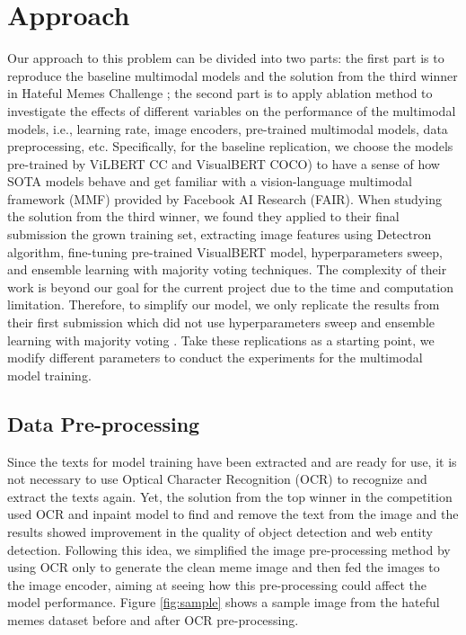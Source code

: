 \documentclass[10pt,twocolumn,letterpaper]{article}
\begin{document}
\section{Approach}
Our approach to this problem can be divided into two parts: the first part is to reproduce the baseline multimodal models \cite{g_kiela2021hateful} and the solution from the third winner in Hateful Memes Challenge \cite{e_velioglu2020detecting}; the second part is to apply ablation method to investigate the effects of different variables on the performance of the multimodal models, i.e., learning rate, image encoders, pre-trained multimodal models, data preprocessing, etc. Specifically, for the baseline replication, we choose the models pre-trained by ViLBERT CC and VisualBERT COCO) to have a sense of how SOTA models behave and get familiar with a vision-language multimodal framework (MMF) provided by Facebook AI Research (FAIR). When studying the solution from the third winner, we found they applied to their final submission the grown training set, extracting image features using Detectron algorithm, fine-tuning pre-trained VisualBERT model, hyperparameters sweep, and ensemble learning with majority voting techniques. The complexity of their work is beyond our goal for the current project due to the time and computation limitation. Therefore, to simplify our model, we only replicate the results from their first submission which did not use hyperparameters sweep and ensemble learning with majority voting . Take these replications as a starting point, we modify different parameters to conduct the experiments for the multimodal model training.

\subsection{Data Pre-processing}
Since the texts for model training have been extracted and are ready for use, it is not necessary to use Optical Character Recognition (OCR) to recognize and extract the texts again. Yet, the solution from the top winner in the competition \cite{f_zhu2020enhance} used OCR and inpaint model to find and remove the text from the image and the results showed improvement in the quality of object detection and web entity detection. Following this idea, we simplified the image pre-processing method by using OCR only to generate the clean meme image and then fed the images to the image encoder, aiming at seeing how this pre-processing could affect the model performance. Figure \ref{fig:sample} shows a sample image from the hateful memes dataset before and after OCR pre-processing.
\end{document}
